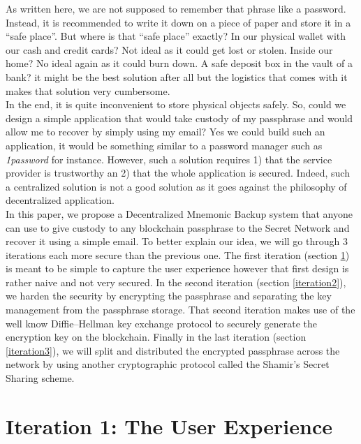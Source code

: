 \documentclass[12pt]{article}
\begin{document}
As written here, we are not supposed to remember that phrase like a password. Instead, it is recommended to write it down on a piece of paper and store it in a ``safe place''. But where is that ``safe place'' exactly? In our physical wallet with our cash and credit cards? Not ideal as it could get lost or stolen. Inside our home? No ideal again as it could burn down. A safe deposit box in the vault of a bank? it might be the best solution after all but the logistics that comes with it makes that solution very cumbersome. \\
 
In the end, it is quite inconvenient to store physical objects safely. So, could we design a simple application that would take custody of my passphrase and would allow me to recover by simply using my email? Yes we could build such an application, it would be something similar to a password manager such as {\em 1password} \cite{1password} for instance. However, such a solution requires 1) that the service provider is trustworthy an 2) that the whole application is secured. Indeed, such a centralized solution is not a good solution as it goes against the philosophy of decentralized application. \\

In this paper, we propose a Decentralized Mnemonic Backup system that anyone can use to give custody to any blockchain passphrase to the Secret Network \cite{SecretNetwork} and recover it using a simple email. To better explain our idea, we will go through 3 iterations each more secure than the previous one. The first iteration (section \ref{iteration1}) is meant to be simple to capture the user experience however that first design is rather naive and not very secured. In the second iteration (section \ref{iteration2}), we harden the security by encrypting the passphrase and separating the key management from the passphrase storage. That second iteration makes use of the well know Diffie–Hellman key exchange protocol to securely generate the encryption key on the blockchain. Finally in the last iteration (section \ref{iteration3}), we will split and distributed the encrypted passphrase across the network by using another cryptographic protocol called the Shamir's Secret Sharing scheme. 

\section{Iteration 1: The User Experience}
\label{iteration1}
\end{document}

